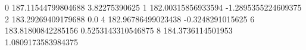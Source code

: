 0 187.11544799804688 3.82275390625
1 182.00315856933594 -1.2895355224609375
2 183.29269409179688 0.0
4 182.96786499023438 -0.3248291015625
6 183.81800842285156 0.5253143310546875
8 184.3736114501953 1.0809173583984375
